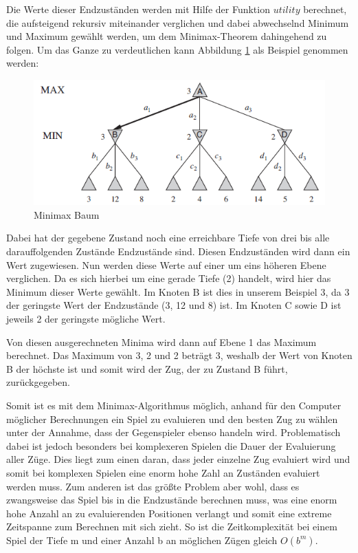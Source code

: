 Die Werte dieser Endzuständen werden mit Hilfe der Funktion $utility$ berechnet, die aufsteigend rekursiv miteinander verglichen und dabei abwechselnd Minimum und Maximum gewählt werden, um dem Minimax-Theorem dahingehend zu folgen. Um das Ganze zu verdeutlichen kann Abbildung \ref{fig:minimax_tree} als Beispiel genommen werden:

\begin{figure}[h]
\centering
\includegraphics[width=\textwidth/5*4]{images/minimax_algorithm_tree.PNG}

\caption{Minimax Baum \cite{Russell2010}}\label{fig:minimax_tree}
\end{figure}

Dabei hat der gegebene Zustand noch eine erreichbare Tiefe von drei bis alle darauffolgenden Zustände Endzustände sind. Diesen Endzuständen wird dann ein Wert zugewiesen. Nun werden diese Werte auf einer um eins höheren Ebene verglichen. Da es sich hierbei um eine gerade Tiefe (2) handelt, wird hier das Minimum dieser Werte gewählt. Im Knoten B ist dies in unserem Beispiel 3, da 3 der geringste Wert der Endzustände (3, 12 und 8) ist. Im Knoten C sowie D ist jeweils 2 der geringste mögliche Wert. 

Von diesen ausgerechneten Minima wird dann auf Ebene 1 das Maximum berechnet. Das Maximum von 3, 2 und 2 beträgt 3, weshalb der Wert von Knoten B der höchste ist und somit wird der Zug, der zu Zustand B führt, zurückgegeben.

Somit ist es mit dem Minimax-Algorithmus möglich, anhand für den Computer möglicher Berechnungen ein Spiel zu evaluieren und den besten Zug zu wählen unter der Annahme, dass der Gegenspieler ebenso handeln wird. Problematisch dabei ist jedoch besonders bei komplexeren Spielen die Dauer der Evaluierung aller Züge. Dies liegt zum einen daran, dass jeder einzelne Zug evaluiert wird und somit bei komplexen Spielen eine enorm hohe Zahl an Zuständen evaluiert werden muss. Zum anderen ist das größte Problem aber wohl, dass es zwangsweise das Spiel bis in die Endzustände berechnen muss, was eine enorm hohe Anzahl an zu evaluierenden Positionen verlangt und somit eine extreme Zeitspanne zum Berechnen mit sich zieht. So ist die Zeitkomplexität bei einem Spiel der Tiefe m und einer Anzahl b an möglichen Zügen gleich $O(b^m)$. \cite[S.169]{Russell2010}


